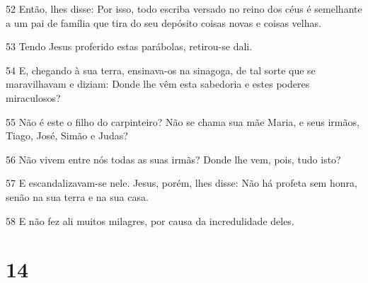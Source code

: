 \par 52 Então, lhes disse: Por isso, todo escriba versado no reino dos céus é semelhante a um pai de família que tira do seu depósito coisas novas e coisas velhas.
\par 53 Tendo Jesus proferido estas parábolas, retirou-se dali.
\par 54 E, chegando à sua terra, ensinava-os na sinagoga, de tal sorte que se maravilhavam e diziam: Donde lhe vêm esta sabedoria e estes poderes miraculosos?
\par 55 Não é este o filho do carpinteiro? Não se chama sua mãe Maria, e seus irmãos, Tiago, José, Simão e Judas?
\par 56 Não vivem entre nós todas as suas irmãs? Donde lhe vem, pois, tudo isto?
\par 57 E escandalizavam-se nele. Jesus, porém, lhes disse: Não há profeta sem honra, senão na sua terra e na sua casa.
\par 58 E não fez ali muitos milagres, por causa da incredulidade deles.

\chapter{14}

